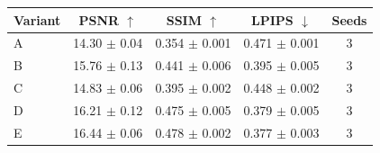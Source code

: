 \begin{tabular}{lcccc}
\toprule
Variant & PSNR $\uparrow$ & SSIM $\uparrow$ & LPIPS $\downarrow$ & Seeds \\
\midrule
A & 14.30 $\pm$ 0.04 & 0.354 $\pm$ 0.001 & 0.471 $\pm$ 0.001 & 3 \\
B & 15.76 $\pm$ 0.13 & 0.441 $\pm$ 0.006 & 0.395 $\pm$ 0.005 & 3 \\
C & 14.83 $\pm$ 0.06 & 0.395 $\pm$ 0.002 & 0.448 $\pm$ 0.002 & 3 \\
D & 16.21 $\pm$ 0.12 & 0.475 $\pm$ 0.005 & 0.379 $\pm$ 0.005 & 3 \\
E & 16.44 $\pm$ 0.06 & 0.478 $\pm$ 0.002 & 0.377 $\pm$ 0.003 & 3 \\
\bottomrule
\end{tabular}
